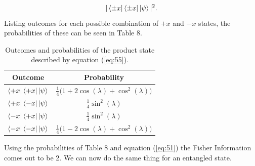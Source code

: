 \documentclass[twocolumn]{article}
\begin{document}
\begin{equation} \label{eq:59}
|\bra{\pm x}\bra{\pm x}\ket{\psi}|^2.
\end{equation}
Listing outcomes for each possible combination of $+x$ and $-x$ states, the probabilities of these can be seen in Table 8.
\newpage
\begin{table}[h!]
\begin{center}
\begin{tabular}{ |c|c| }
\hline Outcome & Probability \\
\hline $\bra{+x}\bra{+x}\ket{\psi}$ & $\frac{1}{4}\big(1+2\cos{(\lambda)}+\cos^2{(\lambda)}\big)$ \\
\hline $\bra{+x}\bra{-x}\ket{\psi}$ & $\frac{1}{4}\sin^2{(\lambda)}$ \\
\hline $\bra{-x}\bra{+x}\ket{\psi}$ & $\frac{1}{4}\sin^2{(\lambda)}$ \\
\hline $\bra{-x}\bra{-x}\ket{\psi}$ & $\frac{1}{4}\big(1-2\cos{(\lambda)}+\cos^2{(\lambda)}\big)$ \\
\hline
\end{tabular}
\caption{Outcomes and probabilities of the product state described by equation (\ref{eq:55}).}
\end{center}
\end{table} 
Using the probabilities of Table 8 and equation (\ref{eq:51}) the Fisher Information comes out to be 2. We can now do the same thing for an entangled state.
\end{document}
